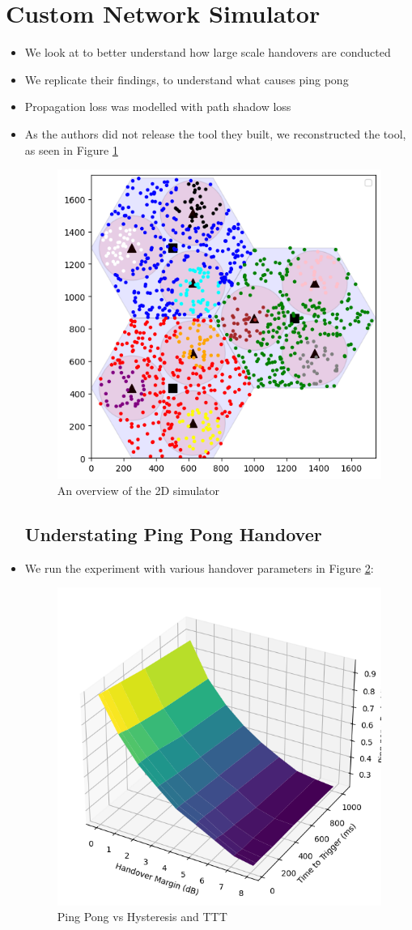 \section{Custom Network Simulator}
\begin{itemize}
    \item We look at \cite{hatipoglu_handover-based_2020} to better understand how large scale handovers are conducted
    \item We replicate their findings, to understand what causes ping pong
    \item Propagation loss was modelled with path shadow loss
    \item As the authors did not release the tool they built, we reconstructed the tool, as seen in Figure \ref{fig:methods:grouped-uesim}
\begin{figure}
    \centering
    \includegraphics[width=0.75\linewidth]{src//img/grouped_uesim.png}
    \caption{An overview of the 2D simulator}
    \label{fig:methods:grouped-uesim}
\end{figure}
\subsection{Understating Ping Pong Handover}
\item We run the experiment with various handover parameters in Figure \ref{fig:methods:pingpong-uesim}:
\begin{figure}
    \centering
    \includegraphics[width=0.5\linewidth]{src//img/pingpong_uesim.png}
    \caption{Ping Pong vs Hysteresis and TTT}
    \label{fig:methods:pingpong-uesim}
\end{figure}
\end{itemize}

